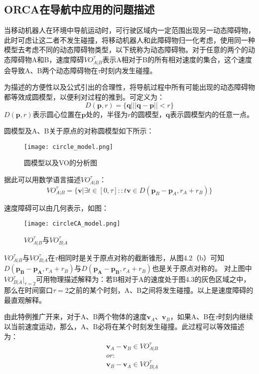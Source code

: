 \subsection{ORCA在导航中应用的问题描述}
当移动机器人在环境中导航运动时，可行驶区域内一定范围出现另一动态障碍物，此时可虑让这二者不发生碰撞，将移动机器人和此障碍物归一化考虑，使用同一种模型去考虑不同的动态障碍物类型，以下统称为动态障碍物。对于任意的两个的动态障碍物A和B，速度障碍$VO^\tau_{A|B}$表示A相对于B的所有相对速度的集合，这个速度会导致A、B两个动态障碍物在$\tau$时刻内发生碰撞。

为描述的方便性以及公式引出的合理性，将导航过程中所有可能出现的动态障碍物都等效成圆模型，以便利对过程的推到。可定义为：
\begin{equation}
    D(\symbf{p},r) = \{\symbf{q}| ||\symbf{q}-\symbf{p}|| < r\}
\end{equation}
$D(\symbf{p},r)$表示圆心位置在$\symbf{p}$处的，半径为$r$的圆模型，$\symbf{q}$表示圆模型内的任意一点。

圆模型及A、B关于原点的对称圆模型如下所示：
\begin{figure}[ht]

    \centering
    \texttt{[image: circle\_model.png]}
    \caption{圆模型以及VO的分析图}
\end{figure}

据此可以用数学语言描述$VO^\tau_{A|B}$：
\begin{equation}
    VO^\tau_{A|B}  = \{\symbf{v}| \exists t \in [0, \tau]::t \symbf{v} \in D(\symbf{p}_B - \symbf{p}_A, r_A + r_B)\}
\end{equation}

速度障碍可以由几何表示，如图：
\begin{figure}[ht]

    \centering
    \texttt{[image: circleCA\_model.png]}
    \caption{$VO^\tau_{A|B}$与$VO^\tau_{B|A}$}
\end{figure}
$VO^\tau_{A|B}$与$VO^\tau_{B|A}$在$\tau$相同时是关于原点对称的截断锥形，从图4.2（b）可知$D(\symbf{p_B-p_A},r_A+r_B)$与$D(\symbf{p_A-p_B},r_A+r_B)$也是关于原点对称的。
对上图中$VO^\tau_{B|A}|_{\tau=2}$可用物理描述解释为：若B相对于A的速度处于图4.3的灰色区域之中，那么在时间窗口$\tau=2$之前的某个时刻，A、B之间将发生碰撞。以上是速度障碍的最直观解释。


由此特例推广开来，对于A、B两个物体的速度$\symbf{v}_A$、$\symbf{v}_B$，如果A、B在$\tau$时刻内继续以当前速度运动，那么，A、B必将在某个时刻发生碰撞。此过程可以等效描述为：
\begin{equation}
    \begin{aligned}
        &\symbf{v}_A - \symbf{v}_B \in  VO^\tau_{A|B} \\
        &or:\\
        &\symbf{v}_B - \symbf{v}_A \in  VO^\tau_{B|A}
    \end{aligned}
\end{equation}

